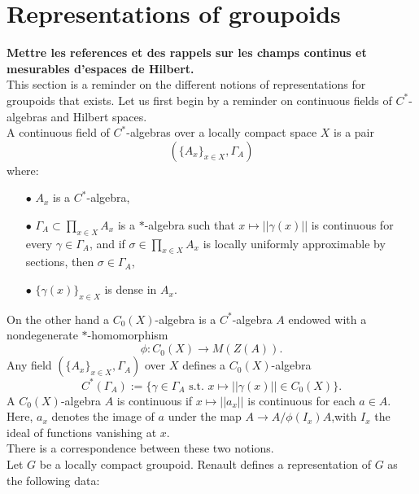 \section{Representations of groupoids}

\textbf{Mettre les references et des rappels sur les champs continus et mesurables d'espaces de Hilbert.}\\

This section is a reminder on the different notions of representations for groupoids that exists. Let us first begin by a reminder on continuous fields of $C^*$-algebras and Hilbert spaces.\\

A continuous field of $C^*$-algebras over a locally compact space $X$ is a pair 
\[ \left( \{ A_x \}_{x\in X} , \Gamma_A \right) \]
where:\\
\begin{itemize}
\item[$\bullet$] $A_x$ is a $C^*$-algebra,\\
\item[$\bullet$] $\Gamma_A \subset \prod_{x\in X} A_x$ is a $*$-algebra such that $x\mapsto || \gamma (x) ||$ is continuous for every $\gamma \in \Gamma_A$, and if $\sigma \in \prod_{x\in X} A_x$ is locally uniformly approximable by sections, then $\sigma\in\Gamma_A$,\\
\item[$\bullet$] $\{ \gamma(x)\}_{x\in X}$ is dense in $A_x$.\\
\end{itemize}

On the other hand a $C_0(X)$-algebra is a $C^*$-algebra $A$ endowed with a nondegenerate $*$-homomorphism 
\[\phi : C_0(X) \rightarrow M(Z(A)). \]
Any field $\left( \{ A_x \}_{x\in X} , \Gamma_A \right) $ over $X$ defines a $C_0(X)$-algebra 
\[C^*(\Gamma_A) := \{\gamma\in \Gamma_A \text{ s.t. } x\mapsto ||\gamma(x) || \in C_0(X)\}.\]
A $C_0(X)$-algebra $A$ is continuous if $x\mapsto || a_x||$ is continuous for each $a\in A$. Here, $a_x$ denotes the image of $a$ under the map $A \rightarrow A / \phi(I_x)A$,with $I_x$ the ideal of functions vanishing at $x$.\\

There is a correspondence between these two notions.\\

Let $G$ be a locally compact groupoid. Renault defines a representation of $G$ as the following data:\\


